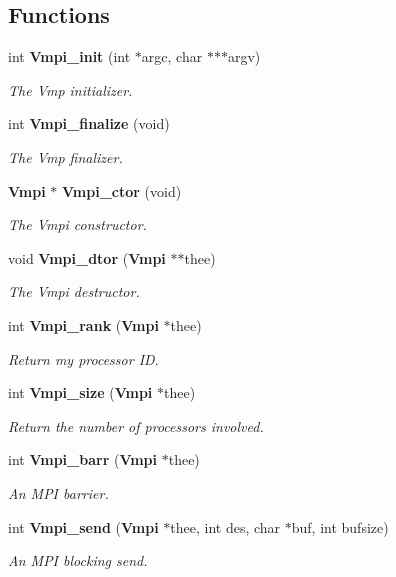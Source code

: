 \subsection*{Functions}
\begin{DoxyCompactItemize}
\item 
int {\bf Vmpi\+\_\+init} (int $\ast$argc, char $\ast$$\ast$$\ast$argv)
\begin{DoxyCompactList}\small\item\em The Vmp initializer. \end{DoxyCompactList}\item 
int {\bf Vmpi\+\_\+finalize} (void)
\begin{DoxyCompactList}\small\item\em The Vmp finalizer. \end{DoxyCompactList}\item 
{\bf Vmpi} $\ast$ {\bf Vmpi\+\_\+ctor} (void)
\begin{DoxyCompactList}\small\item\em The Vmpi constructor. \end{DoxyCompactList}\item 
void {\bf Vmpi\+\_\+dtor} ({\bf Vmpi} $\ast$$\ast$thee)
\begin{DoxyCompactList}\small\item\em The Vmpi destructor. \end{DoxyCompactList}\item 
int {\bf Vmpi\+\_\+rank} ({\bf Vmpi} $\ast$thee)
\begin{DoxyCompactList}\small\item\em Return my processor I\+D. \end{DoxyCompactList}\item 
int {\bf Vmpi\+\_\+size} ({\bf Vmpi} $\ast$thee)
\begin{DoxyCompactList}\small\item\em Return the number of processors involved. \end{DoxyCompactList}\item 
int {\bf Vmpi\+\_\+barr} ({\bf Vmpi} $\ast$thee)
\begin{DoxyCompactList}\small\item\em An M\+P\+I barrier. \end{DoxyCompactList}\item 
int {\bf Vmpi\+\_\+send} ({\bf Vmpi} $\ast$thee, int des, char $\ast$buf, int bufsize)
\begin{DoxyCompactList}\small\item\em An M\+P\+I blocking send. \end{DoxyCompactList}\item 
$$
\end{DoxyCompactItemize}
